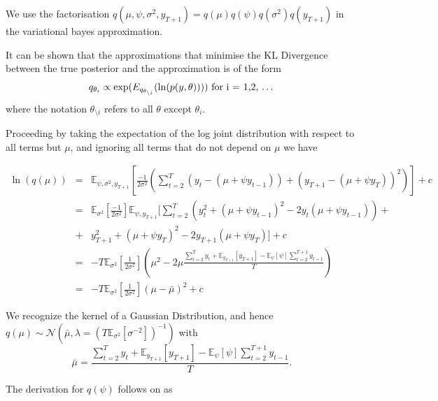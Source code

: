 \documentclass{article}
\begin{document}
We use the factorisation $q(\mu, \psi, \sigma^2, y_{T+1}) = q(\mu)q(\psi)q(\sigma^2)q(y_{T+1})$ in the variational bayes approximation.

It can be shown that the approximations that minimise the KL Divergence between the true posterior and the approximation is of the form
$$q_{\theta_i} \propto \exp(E_{q_{\theta_{\setminus i}}} (\ln(p(y,\theta)))) \mbox{ for i = 1,2, \dots}$$
where the notation $\theta_{\setminus i}$ refers to all $\theta$ except $\theta_i$.

Proceeding by taking the expectation of the log joint distribution with respect to all terms but $\mu$, and ignoring all terms that do not depend on $\mu$ we have

\begin{eqnarray*}
\label{qmu}
\ln(q(\mu)) & = & \mathbb{E}_{\psi, \sigma^2, y_{T+1}} \left[ \frac{-1}{2\sigma^2} \left(\sum^{T}_{t=2}(y_t-(\mu+\psi y_{t-1})) + (y_{T+1}-(\mu+\psi y_T))^2 \right) \right] + c \\
& = &  \mathbb{E}_{\sigma^2} \left[ \frac{-1}{2\sigma^2} \right] \mathbb{E}_{\psi, y_{T+1}} \Bigg[ \sum^{T}_{t=2} (y_t^2 + (\mu+\psi y_{t-1})^2 - 2 y_t (\mu+\psi y_{t-1})) + \\
& + & y_{T+1}^2 +  (\mu+\psi y_T)^2 - 2 y_{T+1}(\mu+\psi y_T)\Bigg] + c \\
& = & -T\mathbb{E}_{\sigma^2} \left[ \frac{1}{2\sigma^2} \right] \left(\mu^2 -2 \mu \frac{\sum^{T}_{t=2}y_t + \mathbb{E}_{y_{T+1}}[y_{T+1}] - \mathbb{E}_{\psi} [\psi] \sum^{T+1}_{t=2}y_{t-1}}{T} \right) \\
& = & -T\mathbb{E}_{\sigma^2} \left[ \frac{1}{2\sigma^2} \right] (\mu - \bar{\mu})^2 + c
\end{eqnarray*}

We recognize the kernel of a Gaussian Distribution, and hence $q(\mu) \sim \mathcal{N}(\bar{\mu}, \lambda = (T\mathbb{E}_{\sigma^2} [\sigma^{-2} ])^{-1})$ with
$$\bar{\mu} = \frac{\sum^{T}_{t=2}y_t + \mathbb{E}_{y_{T+1}}[y_{T+1}] - \mathbb{E}_{\psi} [\psi ]\sum^{T+1}_{t=2}y_{t-1}}{T}.$$

The derivation for $q(\psi)$ follows on as
\end{document}
